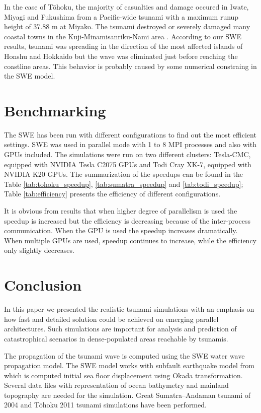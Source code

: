 \documentclass{usiinftr}
\begin{document}
In the case of T\={o}hoku, the majority of casualties and damage occured in Iwate, Miyagi and Fukushima from a Pacific-wide
tsunami with a maximum runup height of 37.88 m at Miyako. The tsunami destroyed or severely damaged many coastal towns in the
Kuji-Minamisanriku-Nami area \cite{tohoku}. According to our SWE results, tsunami
was spreading in the direction of the most affected islands of Honshu and Hokkaido but the wave was eliminated just before reaching
the coastline areas. This behavior is probably caused by some numerical constraing in the SWE model.

\section{Benchmarking} 
\label{sec:benchmarking}
The SWE has been run with different configurations to find out the most efficient settings. SWE was used in 
parallel mode with 1 to 8 MPI processes and also with GPUs included. The simulations were run on two different
clusters: Tesla-CMC, equipped with {NVIDIA} Tesla C2075 GPUs and Todi Cray XK-7, equipped with
{NVIDIA} K20 GPUs. The summarization of the speedups can be found in the Table \ref{tab:tohoku_speedup}, \ref{tab:sumatra_speedup} and \ref{tab:todi_speedup};
Table \ref{tab:efficiency} presents the efficiency of different configurations.

It is obvious from results that when higher degree of parallelism  is used the speedup is increased but
the efficiency is decreasing because of the inter-process communication. When the GPU is used the
speedup increases dramatically. When multiple GPUs are used, speedup continues to increase, while
the efficiency only slightly decreases.

\section{Conclusion} 
In this paper we presented the realistic tsunami simulations with an emphasis on how fast and detailed solution could be achieved on emerging parallel architectures. Such simulations are
important for analysis and prediction of catastrophical scenarios in dense-populated areas reachable by tsunamis.

The propagation of the tsunami wave is computed using the SWE water wave propagation model.
The SWE model works with subfault earthquake model from which is computed
initial sea floor displacement using Okada transformation. Several data files with representation of
ocean bathymetry and mainland topography are needed for the simulation. Great Sumatra--Andaman tsunami of 2004 and
T\={o}hoku 2011 tsunami simulations have been performed.
 
\end{document}

